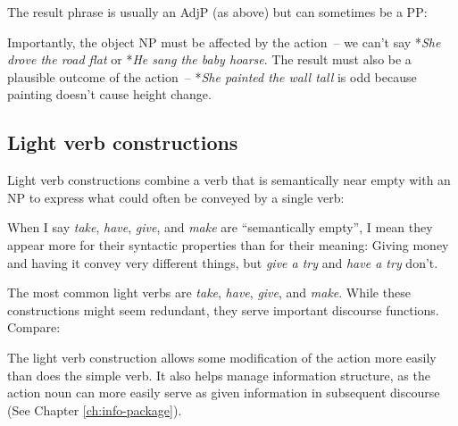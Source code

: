 \ea\label{ex:resultative}
   \z
\z

The result phrase is usually an AdjP (as above) but can sometimes be a PP:

\ea\label{ex:resultative-pp}
   \z
\z

Importantly, the object NP must be affected by the action~-- we can't say *\textit{She drove the road flat} or *\textit{He sang the baby hoarse}. The result must also be a plausible outcome of the action~-- *\textit{She painted the wall tall} is odd because painting doesn't cause height change.

\subsection{Light verb constructions}

Light verb constructions combine a verb that is semantically near empty with an NP to express what could often be conveyed by a single verb:

\ea\label{ex:light-verb}
   \z
\z

When I say \textit{take}, \textit{have}, \textit{give}, and \textit{make} are ``semantically empty'', I mean they appear more for their syntactic properties than for their meaning: Giving money and having it convey very different things, but \textit{give a try} and \textit{have a try} don't. 

The most common light verbs are \textit{take}, \textit{have}, \textit{give}, and \textit{make}. While these constructions might seem redundant, they serve important discourse functions. Compare:

\ea\label{ex:light-verb-use}
   \z
\z

The light verb construction allows some modification of the action more easily than does the simple verb. It also helps manage information structure, as the action noun can more easily serve as given information in subsequent discourse (See Chapter \ref{ch:info-package}).


